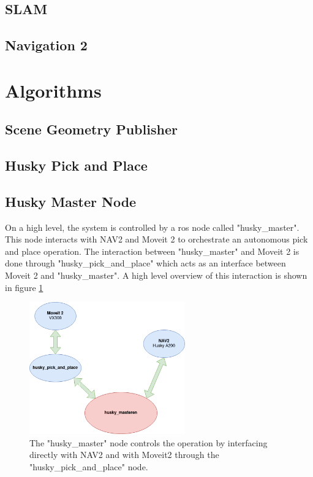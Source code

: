 \subsection{SLAM}

\subsection{Navigation 2}



\section{Algorithms}

\subsection{Scene Geometry Publisher}

\subsection{Husky Pick and Place}


\subsection{Husky Master Node}
On a high level, the system is controlled by a ros node called "husky\_master". This node interacts with NAV2 and Moveit 2 to orchestrate an autonomous pick and place operation. The interaction between "husky\_master" and Moveit 2 is done through "husky\_pick\_and\_place" which acts as an interface between Moveit 2 and "husky\_master". A high level overview of this interaction is shown in figure \ref{fig:husky_master}

\begin{figure}[H]
  \centering
  \includegraphics[width = 0.6\textwidth]{Figures/software_overview.drawio.png}
  \caption{The "husky\_master" node controls the operation by interfacing directly with NAV2 and with Moveit2 through the "husky\_pick\_and\_place" node.}
  \label{fig:husky_master}
\end{figure}
